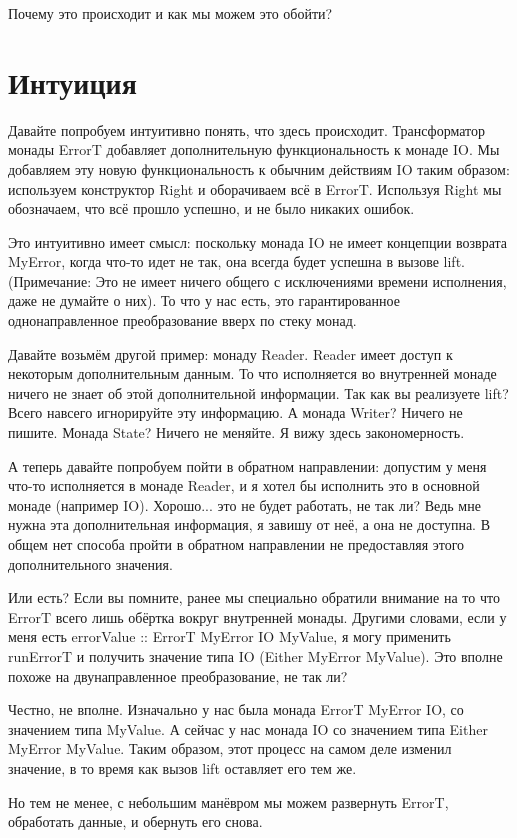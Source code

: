 Почему это происходит и как мы можем это обойти?

\section{Интуиция}
Давайте попробуем интуитивно понять, что здесь происходит. Трансформатор монады
ErrorT добавляет дополнительную функциональность к монаде IO. Мы добавляем эту
новую функциональность к обычним действиям IO таким образом: используем
конструктор Right и оборачиваем всё в ErrorT. Используя Right мы обозначаем,
что всё прошло успешно, и не было никаких ошибок.

Это интуитивно имеет смысл: поскольку монада IO не имеет концепции возврата
MyError, когда что-то идет не так, она всегда будет успешна в вызове lift.
(Примечание: Это не имеет ничего общего с исключениями времени исполнения, даже
не думайте о них). То что у нас есть, это гарантированное однонаправленное
преобразование вверх по стеку монад.

Давайте возьмём другой пример: монаду Reader. Reader имеет доступ к некоторым
дополнительным данным. То что исполняется во внутренней монаде ничего не знает
об этой дополнительной информации. Так как вы реализуете lift? Всего навсего
игнорируйте эту информацию. А монада Writer? Ничего не пишите. Монада State?
Ничего не меняйте. Я вижу здесь закономерность. 

А теперь давайте попробуем пойти в обратном направлении: допустим у меня что-то
исполняется в монаде Reader, и я хотел бы исполнить это в основной монаде
(например IO). Хорошо... это не будет работать, не так ли? Ведь мне нужна эта
дополнительная информация, я завишу от неё, а она не доступна. В общем нет
способа пройти в обратном направлении не предоставляя этого дополнительного
значения.

Или есть? Если вы помните, ранее мы специально обратили внимание на то что
ErrorT всего лишь обёртка вокруг внутренней монады. Другими словами, если у
меня есть errorValue :: ErrorT MyError IO MyValue, я могу применить runErrorT и
получить значение типа IO (Either MyError MyValue). Это вполне похоже на
двунаправленное преобразование, не так ли?

Честно, не вполне. Изначально у нас была монада ErrorT MyError IO, со значением
типа MyValue. А сейчас у нас монада IO со значением типа Either MyError
MyValue. Таким образом, этот процесс на самом деле изменил значение, в то время
как вызов lift оставляет его тем же.

Но тем не менее, с небольшим манёвром мы можем развернуть ErrorT, обработать
данные, и обернуть его снова.

